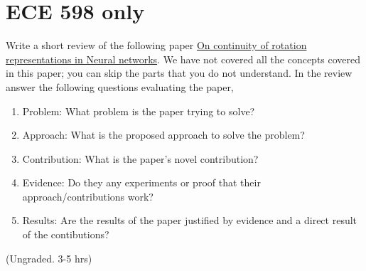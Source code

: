 \documentclass[twocolumn]{article}
\begin{document}
\section{ECE 598 only}

Write a short review of the following paper
\href{https://openaccess.thecvf.com/content_CVPR_2019/html/Zhou_On_the_Continuity_of_Rotation_Representations_in_Neural_Networks_CVPR_2019_paper.html}{On
  continuity of rotation representations in Neural networks}. We have not
covered all the concepts covered in this paper; you can skip the parts that you
do not understand. In the review answer the following questions evaluating the paper,
\begin{enumerate}
\item Problem: What problem is the paper trying to solve?
\item Approach: What is the proposed approach to solve the problem?
\item Contribution: What is the paper's novel contribution?
\item Evidence: Do they any experiments or proof that their approach/contributions work?
\item Results: Are the results of the paper justified by evidence and a direct
  result of the contibutions?
\end{enumerate}
(Ungraded. 3-5 hrs)

%
%
\end{document}
